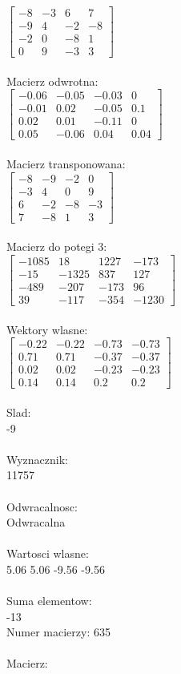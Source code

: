 \documentclass[a4paper,12pt]{article}
\begin{document}
$\begin{bmatrix} -8&-3&6&7\\-9&4&-2&-8\\-2&0&-8&1\\0&9&-3&3 \end{bmatrix}$
\\
\\
Macierz odwrotna:\\

$\begin{bmatrix} -0.06&-0.05&-0.03&0\\-0.01&0.02&-0.05&0.1\\0.02&0.01&-0.11&0\\0.05&-0.06&0.04&0.04 \end{bmatrix}$
\\
\\
Macierz transponowana:\\

$\begin{bmatrix} -8&-9&-2&0\\-3&4&0&9\\6&-2&-8&-3\\7&-8&1&3 \end{bmatrix}$
\\
\\
Macierz do potegi 3:\\

$\begin{bmatrix} -1085&18&1227&-173\\-15&-1325&837&127\\-489&-207&-173&96\\39&-117&-354&-1230 \end{bmatrix}$
\\
\\
Wektory wlasne:\\

$\begin{bmatrix} -0.22&-0.22&-0.73&-0.73\\0.71&0.71&-0.37&-0.37\\0.02&0.02&-0.23&-0.23\\0.14&0.14&0.2&0.2 \end{bmatrix}$
\\
\\
Slad:\\
-9
\\
\\
Wyznacznik:\\
11757
\\
\\
Odwracalnosc:\\
Odwracalna
\\
\\
Wartosci wlasne:\\
5.06 5.06 -9.56 -9.56
\\
\\
Suma elementow:\\
-13
\\
\newpage
Numer macierzy:
635
\\
\\
Macierz:\\
\end{document}
